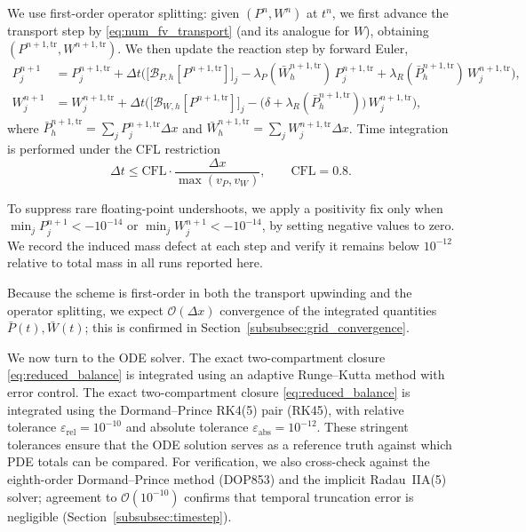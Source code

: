 \documentclass[pdflatex,sn-mathphys-ay]{sn-jnl}
\theoremstyle{thmstyleone}
\theoremstyle{definition}
\theoremstyle{remark}
\begin{document}
We use first-order operator splitting: given $(P^n,W^n)$ at $t^n$,
we first advance the transport step by \eqref{eq:num_fv_transport} (and its analogue for $W$),
obtaining $(P^{n+1,\mathrm{tr}},W^{n+1,\mathrm{tr}})$.
We then update the reaction step by forward Euler,
\begin{align}\label{eq:num_fv_reaction}
P_j^{n+1} &= P_j^{n+1,\mathrm{tr}}
+ \Delta t\Big( \bigl[\mathcal B_{P,h}[P^{n+1,\mathrm{tr}}]\bigr]_j
- \lambda_P(\bar W_h^{n+1,\mathrm{tr}})\,P_j^{n+1,\mathrm{tr}}
+ \lambda_R(\bar P_h^{n+1,\mathrm{tr}})\,W_j^{n+1,\mathrm{tr}}\Big),\\
\nonumber
W_j^{n+1} &= W_j^{n+1,\mathrm{tr}}
+ \Delta t\Big( \bigl[\mathcal B_{W,h}[P^{n+1,\mathrm{tr}}]\bigr]_j
- \big(\delta+\lambda_R(\bar P_h^{n+1,\mathrm{tr}})\big)\,W_j^{n+1,\mathrm{tr}}\Big),
\end{align}
where $\bar P_h^{n+1,\mathrm{tr}}=\sum_j P_j^{n+1,\mathrm{tr}}\Delta x$ and
$\bar W_h^{n+1,\mathrm{tr}}=\sum_j W_j^{n+1,\mathrm{tr}}\Delta x$.
Time integration is performed under the CFL restriction
\begin{equation}\label{eq:num_CFL}
\Delta t \le \mathrm{CFL}\cdot\frac{\Delta x}{\max(v_P,v_W)},\qquad
\mathrm{CFL}=0.8.
\end{equation}

To suppress rare floating-point undershoots, we apply a positivity fix only when
$\min_j P_j^{n+1}< -10^{-14}$ or $\min_j W_j^{n+1}< -10^{-14}$, by setting negative values
to zero. We record the induced mass defect at each step and verify it remains below $10^{-12}$
relative to total mass in all runs reported here.

Because the scheme is first-order in both the transport upwinding and the operator splitting,
we expect $\mathcal{O}(\Delta x)$ convergence of the integrated quantities
$\bar P(t),\bar W(t)$; this is confirmed in
Section~\ref{subsubsec:grid_convergence}.

We now turn to the ODE solver. The exact two-compartment closure \eqref{eq:reduced_balance} is integrated using an adaptive Runge–Kutta method with error control.
The exact two-compartment closure \eqref{eq:reduced_balance} is integrated using the
Dormand--Prince RK4(5) pair (\textsc{RK45}), with relative tolerance $\varepsilon_{\mathrm{rel}}=10^{-10}$
and absolute tolerance $\varepsilon_{\mathrm{abs}}=10^{-12}$.
These stringent tolerances ensure that the ODE solution serves as a reference truth against
which PDE totals can be compared. For verification, we also cross-check against the
eighth-order Dormand--Prince method (\textsc{DOP853}) and the implicit Radau~IIA(5) solver;
agreement to $\mathcal O(10^{-10})$ confirms that temporal truncation error is negligible
(Section~\ref{subsubsec:timestep}).
\end{document}
